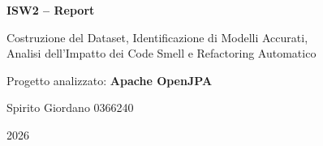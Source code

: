 \begin{titlepage}
    \centering
    \vspace*{3cm}
    {\LARGE\bfseries ISW2 -- Report\par}
    \vspace{0.5cm}
    {\large Costruzione del Dataset, Identificazione di Modelli Accurati,\\
    Analisi dell'Impatto dei Code Smell e Refactoring Automatico\par}
    \vspace{1.5cm}
    {\large Progetto analizzato: \textbf{Apache OpenJPA}\par}
    \vspace{3cm}
    {\large Spirito Giordano 0366240\par}
    \vspace{0.5cm}
    {\large 2026\par}
    \vfill
\end{titlepage}
